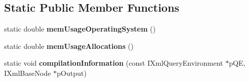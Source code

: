 \subsection*{\-Static \-Public \-Member \-Functions}
\begin{DoxyCompactItemize}
\item 
\hypertarget{classgeneral__server_1_1MemoryLifetimeOwner_ad1e3f10db3958a202e1f822b9d92cdb3}{static double {\bfseries mem\-Usage\-Operating\-System} ()}\label{classgeneral__server_1_1MemoryLifetimeOwner_ad1e3f10db3958a202e1f822b9d92cdb3}

\item 
\hypertarget{classgeneral__server_1_1MemoryLifetimeOwner_a304262f847a8bf847b63059ae21c2872}{static double {\bfseries mem\-Usage\-Allocations} ()}\label{classgeneral__server_1_1MemoryLifetimeOwner_a304262f847a8bf847b63059ae21c2872}

\item 
\hypertarget{classgeneral__server_1_1MemoryLifetimeOwner_ab9c489f1a1f51fbb972dcae5f103a866}{static void {\bfseries compilation\-Information} (const \-I\-Xml\-Query\-Environment $\ast$p\-Q\-E, \-I\-Xml\-Base\-Node $\ast$p\-Output)}\label{classgeneral__server_1_1MemoryLifetimeOwner_ab9c489f1a1f51fbb972dcae5f103a866}

\end{DoxyCompactItemize}

